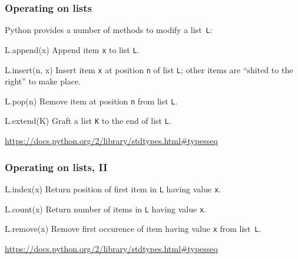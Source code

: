 \documentclass[english,serif,mathserif,xcolor=pdftex,dvipsnames,table]{beamer}
\begin{document}
\begin{frame}[fragile]
  \frametitle{Operating on lists}

  Python provides a number of methods to modify a list~\texttt{L}:

  \begin{describe}{L.append(x)}
    Append item \texttt{x} to list \texttt{L}.
  \end{describe}

  \begin{describe}{L.insert(n, x)}
    Insert item \texttt{x} at position \texttt{n} of list \texttt{L};
    other items are ``shited to the right'' to make place.
  \end{describe}

  \begin{describe}{L.pop(n)}
    Remove item at position \texttt{n} from list \texttt{L}.
  \end{describe}

  \begin{describe}{L.extend(K)}
    Graft a list \texttt{K} to the end of list \texttt{L}.
  \end{describe}

  \begin{references}
    \url{https://docs.python.org/2/library/stdtypes.html#typesseq}
  \end{references}
\end{frame}


\begin{frame}[fragile]
  \frametitle{Operating on lists, II}

  \begin{describe}{L.index(x)}
    Return position of first item in \texttt{L} having value \texttt{x}.
  \end{describe}

  \begin{describe}{L.count(x)}
    Return number of items in \texttt{L} having value \texttt{x}.
  \end{describe}

  \begin{describe}{L.remove(x)}
    Remove first occurence of item having value \texttt{x} from list~\texttt{L}.
  \end{describe}

  \begin{references}
    \url{https://docs.python.org/2/library/stdtypes.html#typesseq}
  \end{references}
\end{frame}
\end{document}
